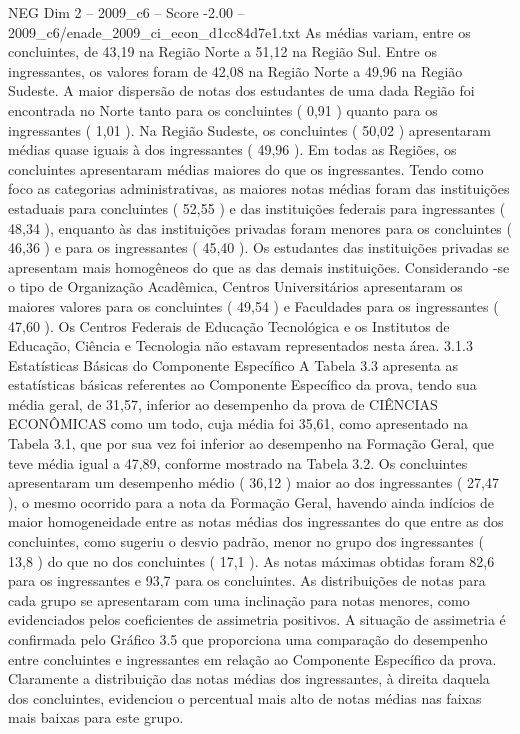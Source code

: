 \begin{textsample}{NEG Dim 2 – 2009\_c6 – Score -2.00 – 2009\_c6/enade\_2009\_ci\_econ\_d1cc84d7e1.txt}
As médias variam, entre os concluintes, de 43,19 na Região Norte a 51,12 na Região Sul.
Entre os ingressantes, os valores foram de 42,08 na Região Norte a 49,96 na Região Sudeste.
A maior dispersão de notas dos estudantes de uma dada Região foi encontrada no Norte tanto para os concluintes ( 0,91 ) quanto para os ingressantes ( 1,01 ).
Na Região Sudeste, os concluintes ( 50,02 ) apresentaram médias quase iguais à dos ingressantes ( 49,96 ).
Em todas as Regiões, os concluintes apresentaram médias maiores do que os ingressantes.
Tendo como foco as categorias administrativas, as maiores notas médias foram das instituições estaduais para concluintes ( 52,55 ) e das instituições federais para ingressantes ( 48,34 ), enquanto às das instituições privadas foram menores para os concluintes ( 46,36 ) e para os ingressantes ( 45,40 ).
Os estudantes das instituições privadas se apresentam mais homogêneos do que as das demais instituições.
Considerando -se o tipo de Organização Acadêmica, Centros Universitários apresentaram os maiores valores para os concluintes ( 49,54 ) e Faculdades para os ingressantes ( 47,60 ).
Os Centros Federais de Educação Tecnológica e os Institutos de Educação, Ciência e Tecnologia não estavam representados nesta área. 3.1.3 Estatísticas Básicas do Componente Específico A Tabela 3.3 apresenta as estatísticas básicas referentes ao Componente Específico da prova, tendo sua média geral, de 31,57, inferior ao desempenho da prova de CIÊNCIAS ECONÔMICAS como um todo, cuja média foi 35,61, como apresentado na Tabela 3.1, que por sua vez foi inferior ao desempenho na Formação Geral, que teve média igual a 47,89, conforme mostrado na Tabela 3.2.
Os concluintes apresentaram um desempenho médio ( 36,12 ) maior ao dos ingressantes ( 27,47 ), o mesmo ocorrido para a nota da Formação Geral, havendo ainda indícios de maior homogeneidade entre as notas médias dos ingressantes do que entre as dos concluintes, como sugeriu o desvio padrão, menor no grupo dos ingressantes ( 13,8 ) do que no dos concluintes ( 17,1 ).
As notas máximas obtidas foram 82,6 para os ingressantes e 93,7 para os concluintes.
As distribuições de notas para cada grupo se apresentaram com uma inclinação para notas menores, como evidenciados pelos coeficientes de assimetria positivos.
A situação de assimetria é confirmada pelo Gráfico 3.5 que proporciona uma comparação do desempenho entre concluintes e ingressantes em relação ao Componente Específico da prova.
Claramente a distribuição das notas médias dos ingressantes, à direita daquela dos concluintes, evidenciou o percentual mais alto de notas médias nas faixas mais baixas para este grupo.

\end{textsample}
